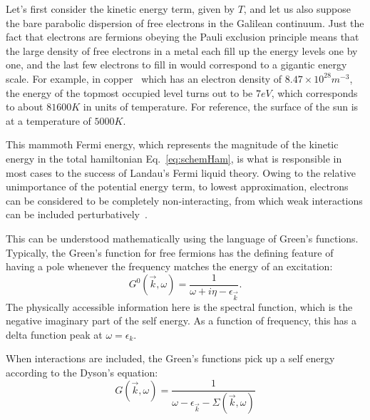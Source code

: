 \par
Let's first consider the kinetic energy term, given by $T$, and let us also suppose the bare parabolic dispersion of free electrons in the Galilean continuum.
Just the fact that electrons are fermions obeying the Pauli exclusion principle means that the large density of free electrons in a metal each fill up the energy levels one by one, and the last few electrons to fill in would correspond to a gigantic energy scale. For example, in copper~\cite{Ashcroft1976} which has an electron density of $8.47\times 10^{28} m^{-3}$, the energy of the topmost occupied level turns out to be $7 eV$, which corresponds to about $81600 K$ in units of temperature. For reference, the surface of the sun is at a temperature of $5000 K$. 
\par 
This mammoth Fermi energy, which represents the magnitude of the kinetic energy in the total hamiltonian Eq.~\eqref{eq:schemHam},  is what is responsible in most cases to the success of Landau's Fermi liquid theory. Owing to the relative unimportance of the potential energy term, to lowest approximation, electrons can be considered to be completely non-interacting, from which weak interactions can be included perturbatively~\cite{luttinger1960ground,baym1961conservation,pines2018microscopic}. 
\par 
This can be understood mathematically using the language of Green's functions. Typically, the Green's function for free fermions has the defining feature of having a pole whenever the frequency matches the energy of an excitation:
\begin{equation}
        G^0(\vec{k},\omega) = \frac{1}{\omega + i\eta - \epsilon_{\vec{k}}} .
\end{equation}
The physically accessible information here is the spectral function, which is the negative imaginary part of the self energy. As a function of frequency, this has a delta function peak at $\omega = \epsilon_k$. 
\par
When interactions are included, the Green's functions pick up a self energy according to the Dyson's equation:
\begin{equation}
    G(\vec{k},\omega) = \frac{1}{\omega - \epsilon_{\vec{k}} - \Sigma(\vec{k},\omega)}
\end{equation}

